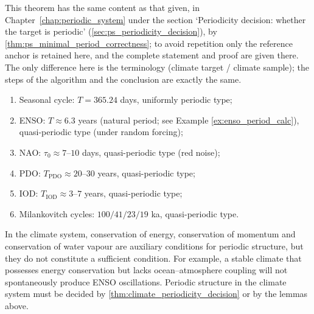 \begin{theorem}\label{thm:climate_minimal_period_correctness}
This theorem has the same content as that given, in Chapter~\ref{chap:periodic_system} under the section `Periodicity decision: whether the target is periodic' (\cref{sec:ps_periodicity_decision}), by \cref{thm:ps_minimal_period_correctness}; to avoid repetition only the reference anchor is retained here, and the complete statement and proof are given there. The only difference here is the terminology (climate target / climate sample); the steps of the algorithm and the conclusion are exactly the same.
\end{theorem}

\begin{example}\label{ex:climate_periodic_examples}
\begin{enumerate}[label=(\roman*)]
    \item Seasonal cycle: $T=365.24$ days, uniformly periodic type;
    \item ENSO: $T\approx6.3$ years (natural period; see Example \ref{ex:enso_period_calc}), quasi-periodic type (under random forcing);
    \item NAO: $\tau_0\approx7$--$10$ days, quasi-periodic type (red noise);
    \item PDO: $T_{\text{PDO}}\approx20$--$30$ years, quasi-periodic type;
    \item IOD: $T_{\text{IOD}}\approx3$--$7$ years, quasi-periodic type;
    \item Milankovitch cycles: $100/41/23/19$ ka, quasi-periodic type.
\end{enumerate}
\end{example}

\begin{remark}\label{rem:climate_invariant_not_period}
In the climate system, conservation of energy, conservation of momentum and conservation of water vapour are auxiliary conditions for periodic structure, but they do not constitute a sufficient condition. For example, a stable climate that possesses energy conservation but lacks ocean--atmosphere coupling will not spontaneously produce ENSO oscillations. Periodic structure in the climate system must be decided by \cref{thm:climate_periodicity_decision} or by the lemmas above.
\end{remark}

